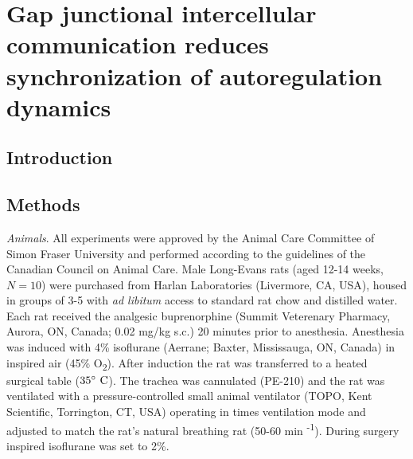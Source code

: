 \chapter{Gap junctional intercellular communication reduces synchronization of autoregulation dynamics}

\section{Introduction}

\section{Methods}
\emph{Animals}. All experiments were approved by the Animal Care Committee of Simon Fraser University and performed according to the guidelines of the Canadian Council on Animal Care. Male Long-Evans rats (aged 12-14 weeks, $N=10$) were purchased from Harlan Laboratories (Livermore, CA, USA), housed in groups of 3-5 with \emph{ad libitum} access to standard rat chow and distilled water.
	Each rat received the analgesic buprenorphine (Summit Veterenary Pharmacy, Aurora, ON, Canada; 0.02 mg/kg s.c.) 20 minutes prior to anesthesia. Anesthesia was induced with 4\% isoflurane (Aerrane; Baxter, Mississauga, ON, Canada) in inspired air (45\% O\textsubscript{2}). After induction the rat was transferred to a heated surgical table ($35 ^{\circ} \ {\rm C}$). The trachea was cannulated (PE-210) and the rat was ventilated with a pressure-controlled small animal ventilator (TOPO, Kent Scientific, Torrington, CT, USA) operating in times ventilation mode and adjusted to match the rat's natural breathing rat (50-60 min \textsuperscript{-1}). During surgery inspired isoflurane was set to 2\%.
	
